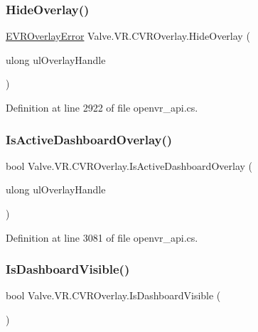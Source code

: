 \subsubsection{\texorpdfstring{HideOverlay()}{HideOverlay()}}
{\footnotesize\ttfamily \mbox{\hyperlink{namespace_valve_1_1_v_r_aaee5c5144f42b7969d45b854f51b0c18}{E\+V\+R\+Overlay\+Error}} Valve.\+V\+R.\+C\+V\+R\+Overlay.\+Hide\+Overlay (\begin{DoxyParamCaption}\item[{ulong}]{ul\+Overlay\+Handle }\end{DoxyParamCaption})}



Definition at line 2922 of file openvr\+\_\+api.\+cs.

\mbox{\label{class_valve_1_1_v_r_1_1_c_v_r_overlay_a68413569ad106e17b3503f392f11de76}} 
\subsubsection{\texorpdfstring{IsActiveDashboardOverlay()}{IsActiveDashboardOverlay()}}
{\footnotesize\ttfamily bool Valve.\+V\+R.\+C\+V\+R\+Overlay.\+Is\+Active\+Dashboard\+Overlay (\begin{DoxyParamCaption}\item[{ulong}]{ul\+Overlay\+Handle }\end{DoxyParamCaption})}



Definition at line 3081 of file openvr\+\_\+api.\+cs.

\mbox{\label{class_valve_1_1_v_r_1_1_c_v_r_overlay_a2f8245632633538da1d5a48addc76559}} 
\subsubsection{\texorpdfstring{IsDashboardVisible()}{IsDashboardVisible()}}
{\footnotesize\ttfamily bool Valve.\+V\+R.\+C\+V\+R\+Overlay.\+Is\+Dashboard\+Visible (\begin{DoxyParamCaption}{ }\end{DoxyParamCaption})}



